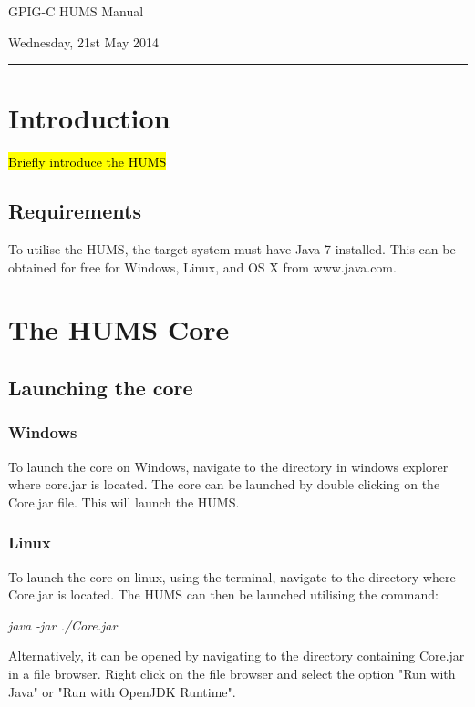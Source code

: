 \documentclass[10pt,a4paper]{article}
\begin{document}
\begin{center}
{\vspace*{-0.5cm}
\Huge GPIG-C HUMS Manual}
\vspace*{0.2cm}

\vspace*{0.1cm}

Wednesday, 21st May 2014
\end{center}
\vspace*{0.4cm}
\hrule
\vspace*{0.4cm}

\tableofcontents

\section{Introduction}

\hl{Briefly introduce the HUMS}

\subsection{Requirements}

To utilise the HUMS, the target system must have Java 7 installed. This can be obtained for free for Windows, Linux, and OS X from www.java.com.

\section{The HUMS Core}
\label{sec:launching}

\subsection{Launching the core}
\subsubsection{Windows}
To launch the core on Windows, navigate to the directory in windows explorer where core.jar is located. The core can be launched by double clicking on the Core.jar file. This will launch the HUMS.
\subsubsection{Linux}
To launch the core on linux, using the terminal, navigate to the directory where Core.jar is located. The HUMS can then be launched utilising the command:
\begin{center}
\textit{java -jar ./Core.jar}
\end{center}
Alternatively, it can be opened by navigating to the directory containing Core.jar in a file browser. Right click on the file browser and select the option "Run with Java" or "Run with OpenJDK Runtime".
\end{document}
